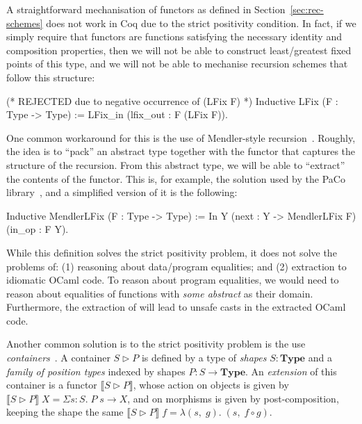 \documentclass{llncs}
\newcommand{\Type}{\mathbf{Type}}
\begin{document}
A straightforward mechanisation of functors as defined in
Section~\ref{sec:rec-schemes} does not work in Coq due to the strict positivity
condition. In fact, if we simply require that functors are functions
satisfying the necessary identity and composition properties, then we will not
be able to construct least/greatest fixed points of this type, and we will not
be able to mechanise recursion schemes that follow this structure:
\begin{coqcode}
(* REJECTED due to negative occurrence of (LFix F) *)
Inductive LFix (F : Type -> Type) := LFix_in (lfix_out : F (LFix F)).
\end{coqcode}

\noindent
One common workaround for this is the use of Mendler-style
recursion~\cite{Mendler91}. Roughly, the idea is to ``pack'' an abstract type
together with the functor that captures the structure of the recursion. From
this abstract type, we will be able to ``extract'' the contents of the functor.
This is, for example, the solution used by the PaCo library~\cite{PaCo}, and a
simplified version of it is the following:
\begin{coqcode}
Inductive MendlerLFix (F : Type -> Type) :=
  In Y (next : Y -> MendlerLFix F) (in_op : F Y).
\end{coqcode}

\noindent
While this definition solves the strict positivity problem, it does not solve
the problems of: (1) reasoning about data/program equalities; and (2) extraction
to idiomatic OCaml code. To reason about program equalities, we would need to
reason about equalities of functions with \emph{some abstract}  as their
domain.  Furthermore, the extraction of  will lead to unsafe casts in
the extracted OCaml code.

Another common solution is to the strict positivity
problem is the use \emph{containers}~\cite{AbbottAG05}.  A container
$S \triangleright P$ is defined by a type of \emph{shapes} $S : \Type$ and a
\emph{family of position types} indexed by shapes $P : S \to \Type$.  An
\emph{extension} of this container is a functor
$\llbracket S \triangleright P \rrbracket$, whose action on objects is given by
$\llbracket S \triangleright P \rrbracket \; X = \Sigma s : S.\; P\;s \to X$,
and on morphisms is given by post-composition, keeping the shape the same
$\llbracket S \triangleright P \rrbracket \; f = \lambda (s,\;g).\;(s,\;f\circ g)$.
\end{document}
